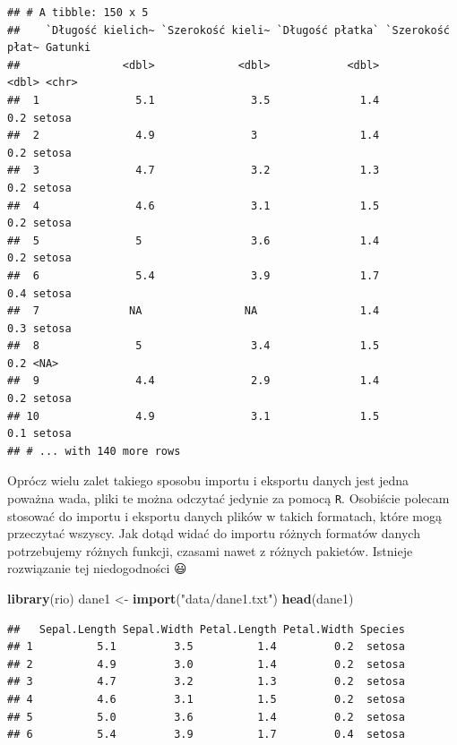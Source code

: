 \documentclass[
]{book}
\newenvironment{Shaded}{\begin{snugshade}}{\end{snugshade}}
\newcommand{\KeywordTok}[1]{\textcolor[rgb]{0.13,0.29,0.53}{\textbf{#1}}}
\newcommand{\NormalTok}[1]{#1}
\newcommand{\StringTok}[1]{\textcolor[rgb]{0.31,0.60,0.02}{#1}}
\theoremstyle{plain}
\theoremstyle{definition}
\theoremstyle{definition}
\theoremstyle{definition}
\theoremstyle{definition}
\theoremstyle{remark}
\begin{document}
\begin{verbatim}
## # A tibble: 150 x 5
##    `Długość kielich~ `Szerokość kieli~ `Długość płatka` `Szerokość płat~ Gatunki
##                <dbl>             <dbl>            <dbl>            <dbl> <chr>  
##  1               5.1               3.5              1.4              0.2 setosa 
##  2               4.9               3                1.4              0.2 setosa 
##  3               4.7               3.2              1.3              0.2 setosa 
##  4               4.6               3.1              1.5              0.2 setosa 
##  5               5                 3.6              1.4              0.2 setosa 
##  6               5.4               3.9              1.7              0.4 setosa 
##  7              NA                NA                1.4              0.3 setosa 
##  8               5                 3.4              1.5              0.2 <NA>   
##  9               4.4               2.9              1.4              0.2 setosa 
## 10               4.9               3.1              1.5              0.1 setosa 
## # ... with 140 more rows
\end{verbatim}

Oprócz wielu zalet takiego sposobu importu i eksportu danych jest jedna poważna wada, pliki te można odczytać jedynie za pomocą \texttt{R}. Osobiście polecam stosować do importu i eksportu danych plików w takich formatach, które mogą przeczytać wszyscy. Jak dotąd widać do importu różnych formatów danych potrzebujemy różnych funkcji, czasami nawet z różnych pakietów. Istnieje rozwiązanie tej niedogodności 😃

\begin{Shaded}
\begin{Highlighting}[]
\KeywordTok{library}\NormalTok{(rio)}
\NormalTok{dane1 <-}\StringTok{ }\KeywordTok{import}\NormalTok{(}\StringTok{"data/dane1.txt"}\NormalTok{)}
\KeywordTok{head}\NormalTok{(dane1)}
\end{Highlighting}
\end{Shaded}

\begin{verbatim}
##   Sepal.Length Sepal.Width Petal.Length Petal.Width Species
## 1          5.1         3.5          1.4         0.2  setosa
## 2          4.9         3.0          1.4         0.2  setosa
## 3          4.7         3.2          1.3         0.2  setosa
## 4          4.6         3.1          1.5         0.2  setosa
## 5          5.0         3.6          1.4         0.2  setosa
## 6          5.4         3.9          1.7         0.4  setosa
\end{verbatim}
\end{document}
